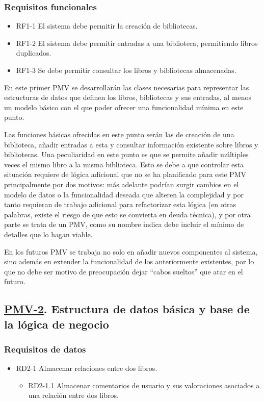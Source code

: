 \subsubsection{Requisitos funcionales}
\begin{itemize}
    \item RF1-1 El sistema debe permitir la creación de bibliotecas.
    \item RF1-2 El sistema debe permitir entradas a una biblioteca, permitiendo libros duplicados.
    \item RF1-3 Se debe permitir consultar los libros y bibliotecas almacenadas.
\end{itemize}

En este primer PMV se desarrollarán las clases necesarias para representar las estructuras de datos que definen los libros, bibliotecas y sus entradas, al menos un modelo básico con el que poder ofrecer una funcionalidad mínima en este punto.

Las funciones básicas ofrecidas en este punto serán las de creación de una biblioteca, añadir entradas a esta y consultar información existente sobre libros y bibliotecas. Una peculiaridad en este punto es que se permite añadir múltiples veces el mismo libro a la misma biblioteca. Esto se debe a que controlar esta situación requiere de lógica adicional que no se ha planificado para este PMV principalmente por dos motivos: más adelante podrían surgir cambios en el modelo de datos o la funcionalidad deseada que alteren la complejidad y por tanto requieran de trabajo adicional para refactorizar esta lógica (en otras palabras, existe el riesgo de que esto se convierta en deuda técnica), y por otra parte se trata de un PMV, como su nombre indica debe incluir el mínimo de detalles que lo hagan viable.

En los futuros PMV se trabaja no solo en añadir nuevos componentes al sistema, sino además en extender la funcionalidad de los anteriormente existentes, por lo que no debe ser motivo de preocupación dejar ``cabos sueltos'' que atar en el futuro.

\subsection{\href{https://github.com/Anglepi/My-Many-Reads/milestone/3}{PMV-2}. Estructura de datos básica y base de la lógica de negocio}

\subsubsection{Requisitos de datos}
\begin{itemize}
    \item RD2-1 Almacenar relaciones entre dos libros.
    \begin{itemize}
        \item RD2-1.1 Almacenar comentarios de usuario y sus valoraciones asociados a una relación entre dos libros.
    \end{itemize}
\end{itemize}

